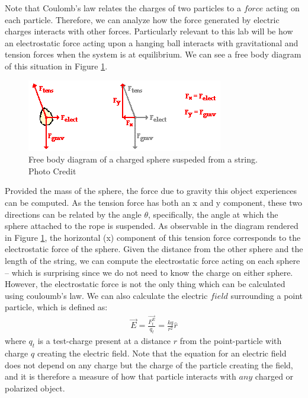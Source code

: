 \documentclass[oneside,12pt]{amsart}
\begin{document}
	\indent Note that Coulomb's law relates the charges of two particles to a $force$ acting on each particle. Therefore, we can analyze how the force generated by electric charges interacts with other forces. Particularly relevant to this lab will be how an electrostatic force acting upon a hanging ball interacts with gravitational and tension forces when the system is at equilibrium. We can see a free body diagram of this situation in Figure \ref{frbdy}.\\
	\begin{figure}[h]
		\includegraphics[width=\medgraph,scale=0.01]{frbdy.png}
		\caption{Free body diagram of a charged sphere suspeded from a string. Photo Credit \cite{physcls} 
		}
		\label{frbdy}
	\end{figure}

	\indent Provided the mass of the sphere, the force due to gravity this object experiences can be computed. As the tension force has both an x and y component, these two directions can be related by the angle $\theta$, specifically, the angle at which the sphere attached to the rope is suspended. As observable in the diagram rendered in Figure \ref{frbdy}, the horizontal (x) component of this tension force corresponds to the electrostatic force of the sphere. Given the distance from the other sphere and the length of the string, we can compute the electrostatic force acting on each sphere -- which is surprising since we do not need to know the charge on either sphere.\\
	
	\indent However, the electrostatic force is not the only thing which can be calculated using couloumb's law. We can also calculate the electric $field$ surrounding a point particle, which is defined as\cite{electricfield}:
	\begin{align}
	\vec{E} = \frac{\vec{F^E_t}}{q_t} = \frac{kq}{r^2}\hat{r}
	\end{align} 
	where $q_t$ is a test-charge present at a distance $r$ from the point-particle with charge $q$ creating the electric field. Note that the equation for an electric field does not depend on any charge but the charge of the particle creating the field, and it is therefore a measure of how that particle interacts with $any$ charged or polarized object.
	
\end{document}
